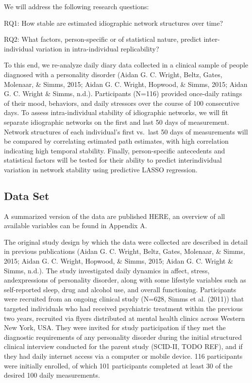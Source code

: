 \documentclass[
  english,
  man]{apa6}
\begin{document}
We will address the following research questions:

RQ1: How stable are estimated idiographic network structures over time?

RQ2: What factors, person-specific or of statistical nature, predict inter-individual variation in intra-individual replicability?

To this end, we re-analyze daily diary data collected in a clinical sample of people diagnosed with a personality disorder (Aidan G. C. Wright, Beltz, Gates, Molenaar, \& Simms, 2015; Aidan G. C. Wright, Hopwood, \& Simms, 2015; Aidan G. C. Wright \& Simms, n.d.). Participants (N=116) provided once-daily ratings of their mood, behaviors, and daily stressors over the course of 100 consecutive days. To assess intra-individual stability of idiographic networks, we will fit separate idiographic networks on the first and last 50 days of measurement. Network structures of each individual's first vs.~last 50 days of measurements will be compared by correlating estimated path estimates, with high correlation indicating high temporal stability. Finally, person-specific antecedents and statistical factors will be tested for their ability to predict interindividual variation in network stability using predictive LASSO regression.

\hypertarget{data-set}{%
\subsection{Data Set}\label{data-set}}

A summarized version of the data are published HERE, an overview of all available variables can be found in Appendix A.

The original study design by which the data were collected are described in detail in previous publications (Aidan G. C. Wright, Beltz, Gates, Molenaar, \& Simms, 2015; Aidan G. C. Wright, Hopwood, \& Simms, 2015; Aidan G. C. Wright \& Simms, n.d.). The study investigated daily dynamics in affect, stress, andexpressions of personality disorder, along with some lifestyle variables such as self-reported sleep, drug and alcohol use, and overall functioning. Participants were recruited from an ongoing clinical study (N=628, Simms et al. (2011)) that targeted individuals who had received psychiatric treatment within the previous two years, recruited via flyers distributed at mental health clinics across Western New York, USA. They were invited for study participation if they met the diagnostic requirements of any personality disorder during the initial structured clinical interview conducted for the parent study (SCID-II, TODO REF), and if they had daily internet access via a computer or mobile device. 116 participants were initially enrolled, of which 101 participants completed at least 30 of the desired 100 daily measurements.
\end{document}
